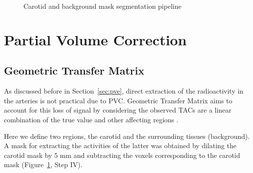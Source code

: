 \begin{figure}[h]
	\centering
	\caption{Carotid and background mask segmentation pipeline}
	\label{fig:seg_pipeline}
\end{figure}

\section{Partial Volume Correction}

\subsection{Geometric Transfer Matrix}
As discussed before in Section~\ref{sec:pve}, direct extraction of the radioactivity in the arteries is not practical due to PVC. %
Geometric Transfer Matrix aims to account for this loss of signal by considering the observed TACs are a linear combination of the true value and other affecting regions \cite{rousset1998correction}. %

Here we define two regions, the carotid and the surrounding tissues (background).
A mask for extracting the activities of the latter was obtained by dilating the carotid mask by 5 mm and subtracting the voxels corresponding to the carotid mask (Figure~\ref{fig:seg_pipeline}, Step IV).

